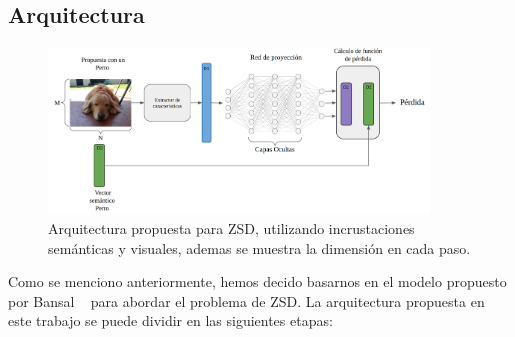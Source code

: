 \subsection{Arquitectura} \label{ssec:arquitectura}
\begin{figure}
	\centering
	\includegraphics[width=0.9\textwidth]{img/arquitectura.png}
	\caption{Arquitectura propuesta para ZSD, utilizando incrustaciones semánticas y visuales, ademas se muestra la dimensión en cada paso.}
	\label{fig:arqutectura}
\end{figure}
Como se menciono anteriormente, hemos decido basarnos en el modelo propuesto por Bansal \etal~\cite{bansal2018zero} para abordar el problema de ZSD. La arquitectura propuesta en este  trabajo se puede dividir en las siguientes etapas:
